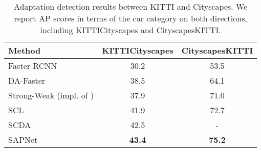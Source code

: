 \documentclass[runningheads]{llncs}
\begin{document}
\begin{table*}[t]
\centering
\caption{Adaptation detection results between KITTI and Cityscapes. We report AP scores in terms of the car category on both directions, including KITTICityscapes and CityscapesKITTI.}
\setlength{\tabcolsep}{9.5pt}
\begin{tabular}{l|c|c}
\hline
Method &KITTICityscapes &CityscapesKITTI \\
\hline
Faster RCNN                              & 30.2    &  53.5    \\
DA-Faster \cite{DBLP:conf/cvpr/Chen0SDG18}           & 38.5    &  64.1    \\
Strong-Weak (impl. of \cite{DBLP:journals/corr/abs-1911-02559}) & 37.9   &  71.0   \\
SCL \cite{DBLP:journals/corr/abs-1911-02559}                   & 41.9    &  72.7    \\
SCDA \cite{DBLP:conf/cvpr/ZhuPYSL19}  & 42.5 & -\\
SAPNet                                     &{\bf 43.4} &{\bf 75.2} \\
\hline
\end{tabular}
\label{table:kitti2city}
\end{table*}
\end{document}
